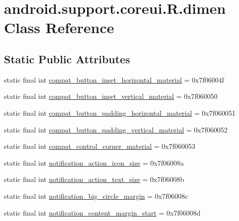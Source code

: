 \hypertarget{classandroid_1_1support_1_1coreui_1_1R_1_1dimen}{}\section{android.\+support.\+coreui.\+R.\+dimen Class Reference}
\label{classandroid_1_1support_1_1coreui_1_1R_1_1dimen}
\subsection*{Static Public Attributes}
\begin{DoxyCompactItemize}
\item 
static final int \mbox{\hyperlink{classandroid_1_1support_1_1coreui_1_1R_1_1dimen_a113d37db2b120347054d243cdab7c406}{compat\+\_\+button\+\_\+inset\+\_\+horizontal\+\_\+material}} = 0x7f06004f
\item 
static final int \mbox{\hyperlink{classandroid_1_1support_1_1coreui_1_1R_1_1dimen_af920529fa9976907709825f3470fee97}{compat\+\_\+button\+\_\+inset\+\_\+vertical\+\_\+material}} = 0x7f060050
\item 
static final int \mbox{\hyperlink{classandroid_1_1support_1_1coreui_1_1R_1_1dimen_a962c0dfd01c24a8867f1c397592dc2bb}{compat\+\_\+button\+\_\+padding\+\_\+horizontal\+\_\+material}} = 0x7f060051
\item 
static final int \mbox{\hyperlink{classandroid_1_1support_1_1coreui_1_1R_1_1dimen_a5b37692327bf9749d0958341e0473558}{compat\+\_\+button\+\_\+padding\+\_\+vertical\+\_\+material}} = 0x7f060052
\item 
static final int \mbox{\hyperlink{classandroid_1_1support_1_1coreui_1_1R_1_1dimen_a1373681ac36f9ece5be58171b1aa6e6d}{compat\+\_\+control\+\_\+corner\+\_\+material}} = 0x7f060053
\item 
static final int \mbox{\hyperlink{classandroid_1_1support_1_1coreui_1_1R_1_1dimen_a67e90fb75a34cba4111616836c9dafc5}{notification\+\_\+action\+\_\+icon\+\_\+size}} = 0x7f06008a
\item 
static final int \mbox{\hyperlink{classandroid_1_1support_1_1coreui_1_1R_1_1dimen_ad9786e898bbe8f9bec84c0fedd60b587}{notification\+\_\+action\+\_\+text\+\_\+size}} = 0x7f06008b
\item 
static final int \mbox{\hyperlink{classandroid_1_1support_1_1coreui_1_1R_1_1dimen_a8fa1227193763fb32a9dc9a6ea38770f}{notification\+\_\+big\+\_\+circle\+\_\+margin}} = 0x7f06008c
\item 
static final int \mbox{\hyperlink{classandroid_1_1support_1_1coreui_1_1R_1_1dimen_aaa3551a87d751122fbc6fbf34a19253b}{notification\+\_\+content\+\_\+margin\+\_\+start}} = 0x7f06008d

\end{DoxyCompactItemize}

